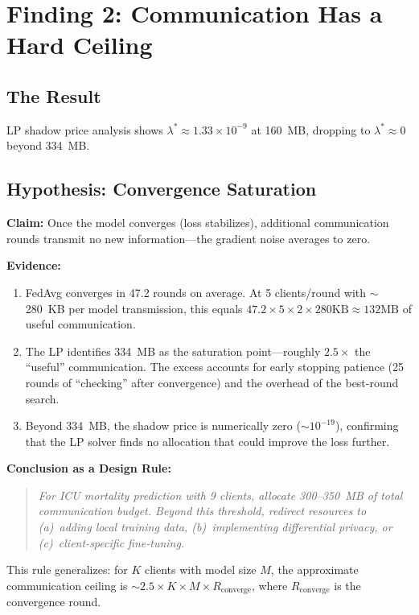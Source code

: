 \documentclass[11pt,a4paper]{report}
\begin{document}
\section{Finding 2: Communication Has a Hard Ceiling}

\subsection{The Result}
LP shadow price analysis shows $\lambda^* \approx 1.33 \times 10^{-9}$ at 160~MB, dropping to $\lambda^* \approx 0$ beyond 334~MB.

\subsection{Hypothesis: Convergence Saturation}
\textbf{Claim:} Once the model converges (loss stabilizes), additional communication rounds transmit no new information---the gradient noise averages to zero.

\textbf{Evidence:}
\begin{enumerate}[leftmargin=2em]
\item FedAvg converges in 47.2 rounds on average. At 5 clients/round with $\sim$280~KB per model transmission, this equals $47.2 \times 5 \times 2 \times 280\text{KB} \approx 132\text{MB}$ of useful communication.
\item The LP identifies 334~MB as the saturation point---roughly $2.5\times$ the ``useful'' communication. The excess accounts for early stopping patience (25 rounds of ``checking'' after convergence) and the overhead of the best-round search.
\item Beyond 334~MB, the shadow price is numerically zero ($\sim 10^{-19}$), confirming that the LP solver finds no allocation that could improve the loss further.
\end{enumerate}

\textbf{Conclusion as a Design Rule:}

\begin{quote}
\emph{For ICU mortality prediction with 9 clients, allocate 300--350~MB of total communication budget. Beyond this threshold, redirect resources to (a)~adding local training data, (b)~implementing differential privacy, or (c)~client-specific fine-tuning.}
\end{quote}

This rule generalizes: for $K$ clients with model size $M$, the approximate communication ceiling is $\sim 2.5 \times K \times M \times R_{\text{converge}}$, where $R_{\text{converge}}$ is the convergence round.
\end{document}
